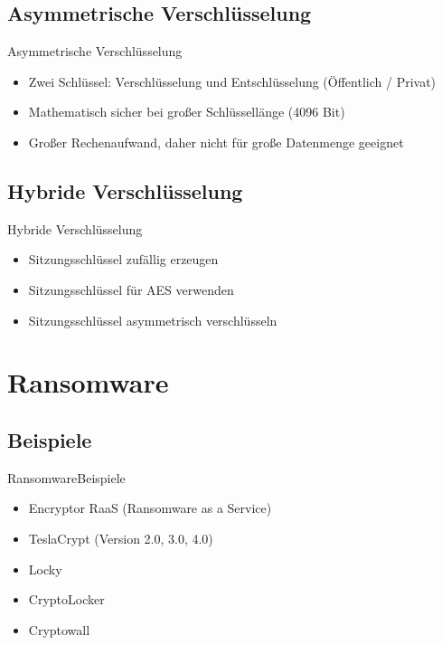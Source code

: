 \documentclass[notes,10pt]{beamer}
\begin{document}
\subsection{Asymmetrische Verschlüsselung}
\begin{frame}{Asymmetrische Verschlüsselung}
	\begin{itemize}
		\item Zwei Schlüssel: Verschlüsselung und Entschlüsselung (Öffentlich / Privat)
		\item Mathematisch sicher bei großer Schlüssellänge (4096 Bit)
		\item Großer Rechenaufwand, daher nicht für große Datenmenge geeignet
	\end{itemize}
\end{frame}
\subsection{Hybride Verschlüsselung}
\begin{frame}{Hybride Verschlüsselung}
	\begin{itemize}
		\item Sitzungsschlüssel zufällig erzeugen
		\item Sitzungsschlüssel für AES verwenden
		\item Sitzungsschlüssel asymmetrisch verschlüsseln
	\end{itemize}
\end{frame}

\section{Ransomware}
\subsection{Beispiele}
\begin{frame}{Ransomware}{Beispiele}
	\begin{itemize}
		\item Encryptor RaaS (Ransomware as a Service)
		\item TeslaCrypt (Version 2.0, 3.0, 4.0)
		\item Locky
		\item CryptoLocker
		\item Cryptowall
	\end{itemize}
\end{frame}
\end{document}
